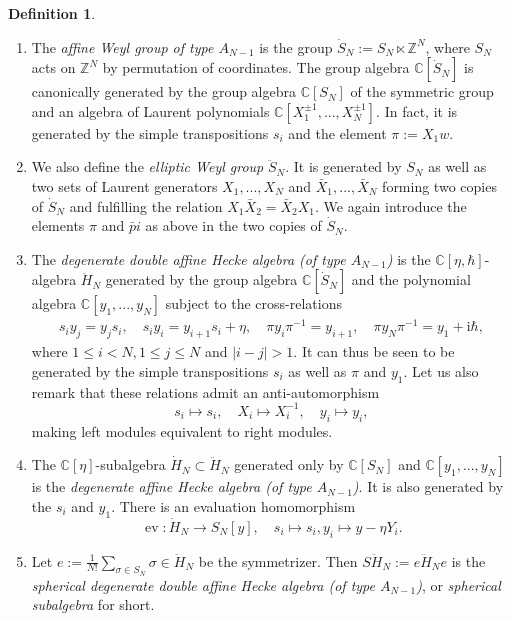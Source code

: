 \documentclass[11pt]{report}
\theoremstyle{definition}
\newtheorem{definition}[theorem]{Definition}
\theoremstyle{remark}
\theoremstyle{remark}
\newcommand{\Z}{\mathbb{Z}}
\newcommand{\C}{\mathbb{C}}
\newcommand{\I}{\mathrm{i}}
\begin{document}
\begin{definition}
\begin{enumerate}[label=(\roman*)]
\item The \emph{affine Weyl group of type $A_{N-1}$} is the group $\dot S_N := S_N \ltimes \Z^N$, where $S_N$ acts on $\Z^N$ by permutation of coordinates. The group algebra $\C[\dot S_N]$ is canonically generated by the group algebra $\C[S_N]$ of the symmetric group and an algebra of Laurent polynomials $\C[X_1^{\pm 1},...,X_N^{\pm 1}]$. In fact, it is generated by the simple transpositions $s_i$ and the element $\pi := X_1 w$.
\item We also define the \emph{elliptic Weyl group} $\ddot S_N$. It is generated by $S_N$ as well as two sets of Laurent generators $X_1,...,X_N$ and $\bar X_1,...,\bar X_N$ forming two copies of $\dot S_N$ and fulfilling the relation $X_1 \bar X_2 = \bar X_2 X_1$. We again introduce the elements $\pi$ and $\bar pi$ as above in the two copies of $\dot S_N$.
\item The \emph{degenerate double affine Hecke algebra (of type $A_{N-1}$)} is the $\C[\eta,\hbar]$-algebra $\ddot H_N$ generated by the group algebra $\C[\dot S_N]$ and the polynomial algebra $\C[y_1,...,y_N]$ subject to the cross-relations
\begin{align*}
s_i y_j = y_j s_i, \quad s_i y_i = y_{i+1} s_i + \eta, \quad \pi y_i \pi^{-1} = y_{i+1}, \quad \pi y_N \pi^{-1} = y_1 + \I \hbar,
\end{align*}
where $1 \leq i < N, 1 \leq j \leq N$ and $|i-j|>1$. It can thus be seen to be generated by the simple transpositions $s_i$ as well as $\pi$ and $y_1$. Let us also remark that these relations admit an anti-automorphism
\begin{equation*}
s_i \mapsto s_i, \quad X_i \mapsto X_i^{-1}, \quad y_i \mapsto y_i,
\end{equation*}
making left modules equivalent to right modules.
\item The $\C[\eta]$-subalgebra $\dot H_N \subset \ddot H_N$ generated only by $\C[S_N]$ and $\C[y_1,...,y_N]$ is the \emph{degenerate affine Hecke algebra (of type $A_{N-1}$)}. It is also generated by the $s_i$ and $y_1$. There is an evaluation homomorphism
\begin{equation*}
\operatorname{ev}: \dot H_N \to S_N[y], \quad s_i \mapsto s_i, y_i \mapsto y - \eta Y_i.
\end{equation*}
\item Let $e := \frac{1}{N!}\sum_{\sigma \in S_N} \sigma \in \ddot H_N$ be the symmetrizer. Then $S\ddot H_N := e \ddot H_N e$ is the \emph{spherical degenerate double affine Hecke algebra (of type $A_{N-1}$)}, or \emph{spherical subalgebra} for short.
\end{enumerate}
\end{definition}
\end{document}
